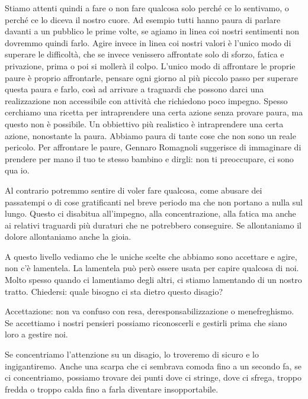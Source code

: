 \documentclass[12pt]{book} %
\begin{document}
Stiamo attenti quindi a fare o non fare qualcosa solo perché ce lo sentivamo, o perché ce lo diceva il nostro cuore. Ad
esempio tutti hanno paura di parlare davanti a un pubblico le prime volte, se agiamo in linea coi nostri sentimenti non
dovremmo quindi farlo. Agire invece in linea coi nostri valori è l'unico modo di superare le difficoltà, che se invece
venissero affrontate solo di sforzo, fatica e privazione, prima o poi si mollerà il colpo. L'unico modo di affrontare
le proprie paure è proprio affrontarle, pensare ogni giorno al più piccolo passo per superare questa paura e farlo,
così ad arrivare a traguardi che possono darci una realizzazione non accessibile con attività che richiedono poco
impegno. Spesso cerchiamo una ricetta per intraprendere una certa azione senza provare paura, ma questo non è
possibile. Un obbiettivo più realistico è intraprendere una certa azione, nonostante la paura. Abbiamo paura di tante
cose che non sono un reale pericolo. Per affrontare le paure, Gennaro Romagnoli suggerisce di immaginare di prendere
per mano il tuo te stesso bambino e dirgli: non ti preoccupare, ci sono qua io. 

Al contrario potremmo sentire di voler fare qualcosa, come abusare dei passatempi o di cose gratificanti nel breve
periodo ma che non portano a nulla sul lungo. Questo ci disabitua all'impegno, alla concentrazione, alla fatica ma
anche ai relativi traguardi più duraturi che ne potrebbero conseguire. Se allontaniamo il dolore allontaniamo anche la
gioia.

\bigskip

A questo livello vediamo che le uniche scelte che abbiamo sono accettare e agire, non c'è lamentela. La lamentela può
però essere usata per capire qualcosa di noi. Molto spesso quando ci lamentiamo degli altri, ci stiamo lamentando di un
nostro tratto. Chiedersi: quale bisogno ci sta dietro questo disagio? 

\bigskip

Accettazione: non va confuso con resa, deresponsabilizzazione o menefreghismo. Se accettiamo i nostri pensieri possiamo
riconoscerli e gestirli prima che siano loro a gestire noi. 


\bigskip


Se concentriamo l'attenzione su un disagio, lo
troveremo di sicuro e lo ingigantiremo. Anche una scarpa che ci sembrava comoda fino a un secondo fa, se ci
concentriamo, possiamo trovare dei punti dove ci stringe, dove ci sfrega, troppo fredda o troppo calda fino a farla
diventare insopportabile.
\end{document}
